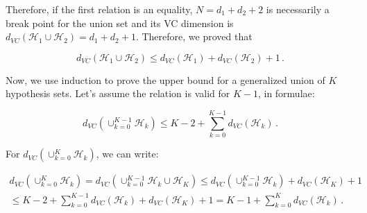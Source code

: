 \documentclass[11pt]{article}
\makeatletter
\newcommand{\boxspacing}{\kern\kvtcb@left@rule\kern\kvtcb@boxsep}
\newcommand{\prompt}[4]{
        \ttfamily\llap{{\color{#2}[#3]:\hspace{3pt}#4}}\vspace{-\baselineskip}
    }
\makeatother
\begin{document}
Therefore, if the first relation is an equality, \(N=d_1+d_2+2\) is
necessarily a break point for the union set and its VC dimension is
\(d_{VC}(\mathcal{H}_1\cup \mathcal{H}_2)=d_1+d_2+1\). Therefore, we
proved that

\[
d_{VC}(\mathcal{H}_1\cup \mathcal{H}_2)\le d_{VC}(\mathcal{H}_1)+d_{VC}(\mathcal{H}_2)+1\,.
\]

Now, we use induction to prove the upper bound for a generalized union
of \(K\) hypothesis sets. Let's assume the relation is valid for
\(K-1\), in formulae:

\[
d_{VC}(\cup_{k=0}^{K-1} \mathcal{H}_k)\le K-2+\sum_{k=0}^{K-1} d_{VC}(\mathcal{H}_k)\,.
\]

For \(d_{VC}(\cup_{k=0}^{K} \mathcal{H}_k)\), we can write:

\begin{equation}
\begin{split}
d_{VC}(\cup_{k=0}^{K} \mathcal{H}_k)= d_{VC}(\cup_{k=0}^{K-1} \mathcal{H}_k \cup \mathcal{H}_K)\le d_{VC}(\cup_{k=0}^{K-1} \mathcal{H}_k)+d_{VC}(\mathcal{H}_K)+1\\ \le K-2+\sum_{k=0}^{K-1} d_{VC}(\mathcal{H}_k)+d_{VC}(\mathcal{H}_K)+1=K-1+\sum_{k=0}^{K} d_{VC}(\mathcal{H}_k)\,.
\end{split}
\end{equation}

    \begin{tcolorbox}[breakable, size=fbox, boxrule=1pt, pad at break*=1mm,colback=cellbackground, colframe=cellborder]
\prompt{In}{incolor}{ }{\boxspacing}
\begin{Verbatim}[commandchars=\\\{\}]

\end{Verbatim}
\end{tcolorbox}


    
    
    
\end{document}
